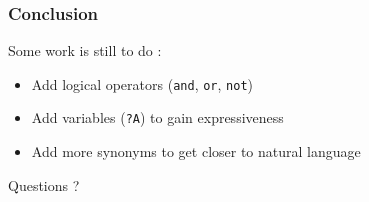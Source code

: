 \documentclass{beamer}
\begin{document}
  \begin{frame}
    \frametitle{Conclusion}
    Some work is still to do :
    \begin{itemize}
      \item Add logical operators (\texttt{and}, \texttt{or}, \texttt{not})
      \item Add variables (\texttt{?A}) to gain expressiveness
      \item Add more synonyms to get closer to natural language
    \end{itemize}

  \end{frame}
\begin{frame}
  \centering
  Questions ?
\end{frame}
\end{document}
